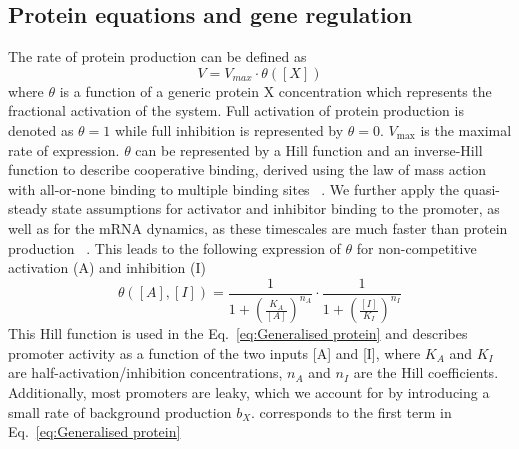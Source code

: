 \subsection{Protein equations and gene regulation}\label{Protein equations and gene regulation}
The rate of protein production can be defined as
\begin{equation}
    V = V_{max} \cdot \theta([X])
    \label{eq: vmax}
\end{equation}
where $\theta$ is a function of a generic protein X concentration which represents the fractional activation of the system.
Full activation of protein production is denoted as $\theta=1$ while full inhibition is represented by $\theta=0$.
$V_{\max}$ is the maximal rate of expression.
$\theta$ can be represented by a Hill function and an inverse-Hill function to describe cooperative binding,
derived using the law of mass action with all-or-none binding to multiple binding sites ~\parencite{Weiss1997}.
We further apply the quasi-steady state assumptions for activator and inhibitor binding to the promoter,
as well as for the mRNA dynamics,
as these timescales are much faster than protein production ~\parencite{Andersen1998, Bremer2008}.
This leads to the following expression of $\theta$ for non-competitive activation (A) and inhibition (I)
\begin{equation}
    \theta([A],[I])= \frac{1}{1+\left(\frac{K_{A}}{[A]}\right)^{n_{A}}} \cdot \frac{1}{1+\left(\frac{[I]}{K_{I}}\right)^{n_{I}}}
    \label{eq:theta}
\end{equation}
This Hill function is used in the Eq.~\ref{eq:Generalised protein} and describes promoter activity as a function of the two inputs [A] and [I], where $K_{A}$ and $K_{I}$ are half-activation/inhibition concentrations, $n_{A}$ and $n_{I}$ are the Hill coefficients.
Additionally, most promoters are leaky,
which we account for by introducing a small rate of background production $b_{X}$.
corresponds to the first term in Eq.~\ref{eq:Generalised protein}

